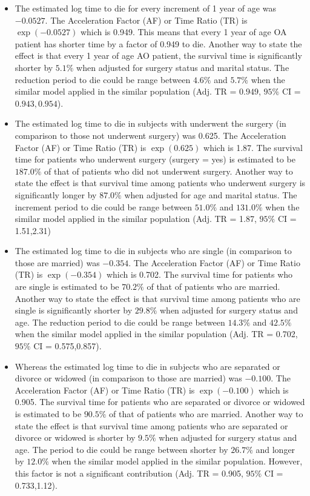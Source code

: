 \documentclass[
  10pt,
]{krantz}
\begin{document}
\begin{itemize}
\item
  The estimated log time to die for every increment of 1 year of age was \(-0.0527\). The Acceleration Factor (AF) or Time Ratio (TR) is \(\exp(-0.0527)\) which is 0.949. This means that every 1 year of age OA patient has shorter time by a factor of 0.949 to die. Another way to state the effect is that every 1 year of age AO patient, the survival time is significantly shorter by \(5.1\%\) when adjusted for surgery status and marital status. The reduction period to die could be range between \(4.6\%\) and \(5.7\%\) when the similar model applied in the similar population (Adj. TR = \(0.949\), \(95\%\) CI = \(0.943,0.954\)).
\item
  The estimated log time to die in subjects with underwent the surgery (in comparison to those not underwent surgery) was 0.625. The Acceleration Factor (AF) or Time Ratio (TR) is \(\exp(0.625)\) which is 1.87. The survival time for patients who underwent surgery (surgery = yes) is estimated to be \(187.0\%\) of that of patients who did not underwent surgery. Another way to state the effect is that survival time among patients who underwent surgery is significantly longer by \(87.0\%\) when adjusted for age and marital status. The increment period to die could be range between \(51.0\%\) and \(131.0\%\) when the similar model applied in the similar population (Adj. TR = 1.87, \(95\%\) CI = 1.51,2.31)
\item
  The estimated log time to die in subjects who are single (in comparison to those are married) was \(-0.354\). The Acceleration Factor (AF) or Time Ratio (TR) is \(\exp(-0.354)\) which is 0.702. The survival time for patients who are single is estimated to be \(70.2\%\) of that of patients who are married. Another way to state the effect is that survival time among patients who are single is significantly shorter by \(29.8\%\) when adjusted for surgery status and age. The reduction period to die could be range between \(14.3\%\) and \(42.5\%\) when the similar model applied in the similar population (Adj. TR = 0.702, \(95\%\) CI = 0.575,0.857).
\item
  Whereas the estimated log time to die in subjects who are separated or divorce or widowed (in comparison to those are married) was \(-0.100\). The Acceleration Factor (AF) or Time Ratio (TR) is \(\exp(-0.100)\) which is 0.905. The survival time for patients who are separated or divorce or widowed is estimated to be \(90.5\%\) of that of patients who are married. Another way to state the effect is that survival time among patients who are separated or divorce or widowed is shorter by \(9.5\%\) when adjusted for surgery status and age. The period to die could be range between shorter by \(26.7\%\) and longer by \(12.0\%\) when the similar model applied in the similar population. However, this factor is not a significant contribution (Adj. TR = 0.905, \(95\%\) CI = 0.733,1.12).
\end{itemize}
\end{document}
